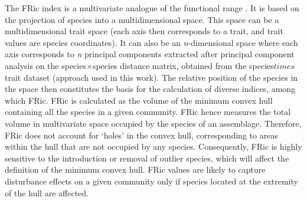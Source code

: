 The FRic index is a multivariate analogue of the functional range \citep{Legras2018, Villeger2008, Schleuter2010}. It is based on the projection of species into a multidimensional space. This space can be a multidimensional trait space (each axis then corresponds to a trait, and trait values are species coordinates). It can also be an \textit{n}-dimensional space where each axis corresponds to \textit{n} principal components extracted after principal component analysis on the species$\times$species distance matrix, obtained from the species$times$trait dataset (approach used in this work). The relative position of the species in the space then constitutes the basis for the calculation of diverse indices, among which FRic. 
FRic is calculated as the volume of the minimum convex hull containing all the species in a given community. FRic hence measures the total volume in multivariate space occupied by the species of an assemblage. Therefore, FRic does not account for `holes' in the convex hull, corresponding to areas within the hull that are not occupied by any species. Consequently, FRic is highly sensitive to the introduction or removal of outlier species, which will affect the definition of the minimum convex hull. FRic values are likely to capture disturbance effects on a given community only if species located at the extremity of the hull are affected.
\vspace{0.5cm}
